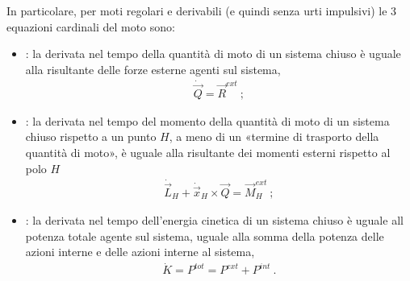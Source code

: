 \documentclass[letterpaper,10pt,italian]{jupyterBook}
\begin{document}
\sphinxAtStartPar
In particolare, per moti regolari e derivabili (e quindi senza urti impulsivi) le 3 equazioni cardinali del moto sono:
\begin{itemize}
\item {} 
\sphinxAtStartPar
{}: la derivata nel tempo della quantità di moto di un sistema chiuso è uguale alla risultante delle forze esterne agenti sul sistema,
\begin{equation*}
\begin{split}\dot{\vec{Q}} = \vec{R}^{ext} \ ;\end{split}
\end{equation*}
\item {} 
\sphinxAtStartPar
{}: la derivata nel tempo del momento della quantità di moto di un sistema chiuso rispetto a un punto \(H\), a meno di un «termine di trasporto della quantità di moto», è uguale alla risultante dei momenti esterni rispetto al polo \(H\)
\begin{equation*}
\begin{split}\dot{\vec{L}}_H + \dot{\vec{x}}_H \times \vec{Q} = \vec{M}^{ext}_H \ ;\end{split}
\end{equation*}
\item {} 
\sphinxAtStartPar
{}: la derivata nel tempo dell’energia cinetica di un sistema chiuso è uguale all potenza totale agente sul sistema, uguale alla somma della potenza delle azioni interne e delle azioni interne al sistema,
\begin{equation*}
\begin{split}\dot{K} = P^{tot} = P^{ext} + P^{int} \ .\end{split}
\end{equation*}
\end{itemize}

\sphinxstepscope
\end{document}

